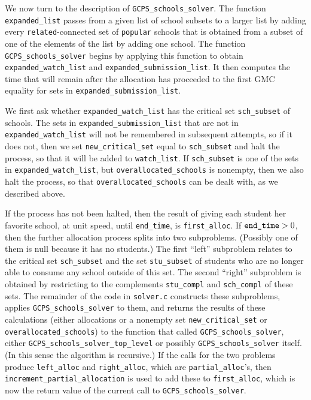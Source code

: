 \documentclass[12pt]{article}
\theoremstyle{definition}
\begin{document}
\begin{appendix}
We now turn to the description of \texttt{GCPS\_schools\_solver}.  The
function \texttt{expanded\_list} passes from a given list of school
subsets to a larger list by adding every \texttt{related}-connected
set of \texttt{popular} schools that is obtained from a subset of one
of the elements of the list by adding one school.  The function
\texttt{GCPS\_schools\_solver} begins by applying this function to
obtain \texttt{expanded\_watch\_list} and
\texttt{expanded\_submission\_list}.  It then computes the time that
will remain after the allocation has proceeded to the first GMC
equality for sets in \texttt{expanded\_submission\_list}.

We first ask whether \texttt{expanded\_watch\_list} has the critical
set \texttt{sch\_subset} of schools.  The sets in
\texttt{expanded\_submission\_list} that are not in
\texttt{expanded\_watch\_list} will not be remembered in subsequent
attempts, so if it does not, then we set \texttt{new\_critical\_set}
equal to \texttt{sch\_subset} and halt the process, so that it will be
added to \texttt{watch\_list}.  If \texttt{sch\_subset} is one of the
sets in \texttt{expanded\_watch\_list}, but
\texttt{overallocated\_schools} is nonempty, then we also halt the
process, so that \texttt{overallocated\_schools} can be dealt with, as
we described above.

If the process has not been halted, then the result of giving each
student her favorite school, at unit speed, until \texttt{end\_time},
is \texttt{first\_alloc}.  If $\text{\texttt{end\_time}} > 0$, then
the further allocation process splits into two subproblems.  (Possibly
one of them is null because it has no students.)  The first ``left''
subproblem relates to the critical set \texttt{sch\_subset} and the
set \texttt{stu\_subset} of students who are no longer able to consume
any school outside of this set.  The second ``right'' subproblem is
obtained by restricting to the complements \texttt{stu\_compl} and
\texttt{sch\_compl} of these sets.  The remainder of the code in
\texttt{solver.c} constructs these subproblems, applies
\texttt{GCPS\_schools\_solver} to them, and returns the results of
these calculations (either allocations or a nonempty set
\texttt{new\_critical\_set} or \texttt{overallocated\_schools}) to the
function that called \texttt{GCPS\_schools\_solver}, either
\texttt{GCPS\_schools\_solver\_top\_level} or possibly
\texttt{GCPS\_schools\_solver} itself.  (In this sense the algorithm
is recursive.)  If the calls for the two problems produce
\texttt{left\_alloc} and \texttt{right\_alloc}, which are
\texttt{partial\_alloc}'s, then
\texttt{increment\_partial\_allocation} is used to add these to
\texttt{first\_alloc}, which is now the return value of the current
call to \texttt{GCPS\_schools\_solver}.


\end{appendix}
\end{document}
